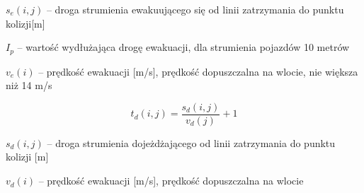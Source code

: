 \begin{math} s_{e} (i,j) \end{math} \textrm{ -- droga strumienia ewakuującego się od linii zatrzymania do punktu kolizji[m]}

\begin{math} I_p \end{math} \textrm{ -- wartość wydłużająca drogę ewakuacji, dla strumienia pojazdów 10 metrów}

\begin{math} v_{e} (i) \end{math} \textrm{ -- prędkość ewakuacji [m/s], prędkość dopuszczalna na wlocie, nie większa niż 14 m/s}

\begin{equation}
	t_{d} (i,j) = \frac{s_{d} (i,j)}{v_{d} (j)} + 1
\end{equation}

\begin{math} s_{d} (i,j) \end{math} \textrm{ -- droga strumienia dojeżdżającego od linii zatrzymania do punktu kolizji [m]}

\begin{math} v_{d} (i) \end{math} \textrm{ -- prędkość ewakuacji [m/s], prędkość dopuszczalna na wlocie}